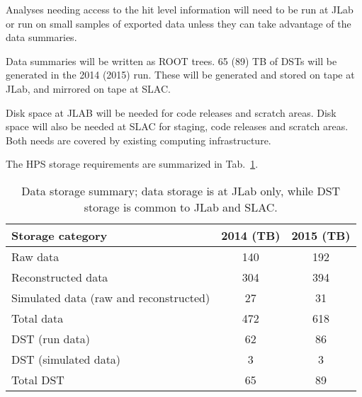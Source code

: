 Analyses needing
access to the hit level information will need to be run at JLab or run
on small samples of exported data unless they can take advantage of the
data summaries.

Data summaries will be written as ROOT trees. 65 (89) TB of DSTs will be generated 
in the 2014 (2015) run. These will be generated and stored on tape at JLab, and mirrored on tape at SLAC.

Disk space at JLAB will be 
needed for code releases and scratch areas. 
Disk space will also be needed at SLAC for staging, code releases and scratch areas. 
Both needs are covered by existing computing infrastructure.

The HPS storage requirements are summarized in Tab.~\ref{tab:datastorage}.
\begin{table}[ht]
\centering
\begin{tabular}{|l|c|c|}
\hline
Storage category & 2014 (TB) & 2015 (TB) \\
\hline
Raw data & 140 & 192 \\
Reconstructed data & 304 & 394 \\
Simulated data (raw and reconstructed) & 27 & 31 \\
\hline
Total data & 472 & 618 \\
\hline
DST (run data) & 62 & 86 \\
DST (simulated data) & 3 & 3 \\
\hline
Total DST  & 65  & 89 \\
\hline
\end{tabular}
\caption{{\small Data storage summary; data storage is at JLab only, while DST storage is common to JLab and SLAC.}}
\label{tab:datastorage}
\end{table}

